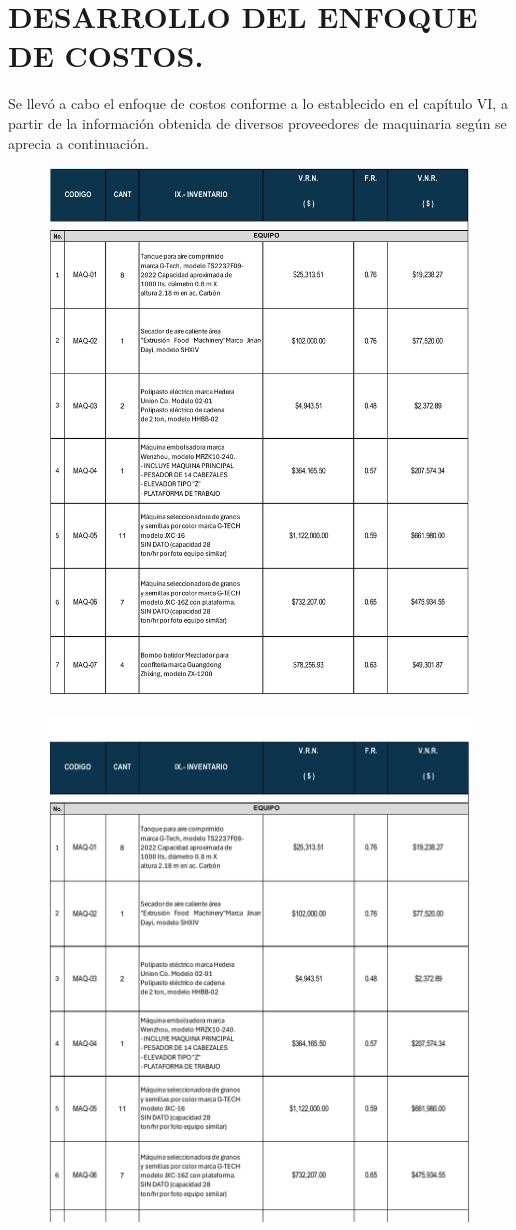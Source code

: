 
\chapter{DESARROLLO DEL ENFOQUE DE COSTOS.} %

Se llevó a cabo el enfoque de costos conforme a lo establecido en el capítulo VI,
a partir de la información obtenida de diversos proveedores de maquinaria 
según se aprecia a continuación.

\begin{figure}[hbtp!]
	\centering
\includegraphics[width= 0.75 \linewidth, page = 1]{../0.imagenes/CAP_7/enfoque_costos_1.pdf}
\end{figure}
\newpage
\begin{figure}[hbtp!]
	\centering
\includegraphics[width= 0.75 \linewidth, page = 2]{../0.imagenes/CAP_7/enfoque_costos_2.pdf}
\end{figure}
\espacio
